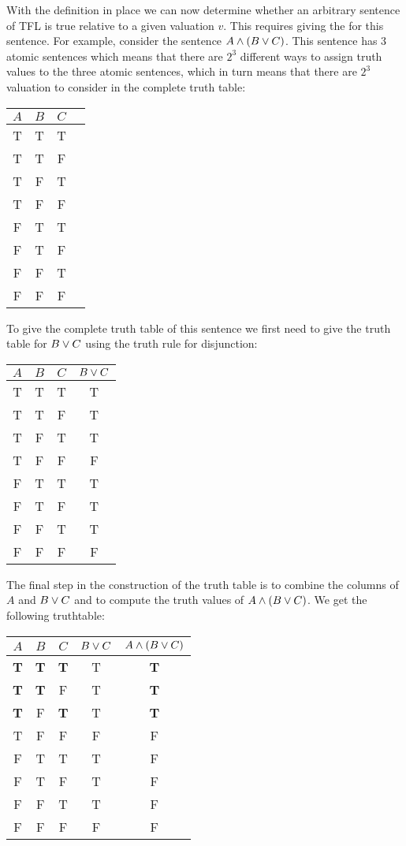 With the definition in place we can now determine whether an arbitrary sentence of TFL is true relative to a given valuation $v$. This requires giving the  for this sentence. For example, consider the sentence $A\mathbin{\wedge}(B\vee C)$. This sentence has 3 atomic sentences which means that there are $2^3$ different ways to assign truth values to the three atomic sentences, which in turn means that there are $2^3$ valuation to consider in the complete truth table: 

\begin{center}
\begin{tabular}{ccc|c}
$A$&$B$&$C$&\\\hline
T& T &T&\\
T & T & F&\\
T & F & T& \\
T & F &F&\\
F & T &T&\\
F& T & F & \\
F & F & T &\\
F & F & F& 
\end{tabular}
\end{center}


To give the complete truth table of this sentence we first need to give the truth table for $B\vee C$ using the truth rule for disjunction:

\begin{center}
\begin{tabular}{ccc|c}
$A$&$B$&$C$&$B\vee C$\\\hline
T& T &T&T\\
T & T & F&T\\
T & F & T&T \\
T & F &F&F\\
F & T &T&T\\
F& T & F & T\\
F & F & T &T\\
F & F & F& F
\end{tabular}
\end{center}

The final step in the construction of the truth table is to combine the columns of $A$ and $B\vee C$ and to compute the truth values of $A\wedge (B\vee C)$. We get the following truthtable:

\begin{center}
\begin{tabular}{ccc|c||c}
$A$&$B$&$C$&$B\vee C$&$A\mathbin{\wedge}(B\vee C)$\\\hline
\textbf{T} & \textbf{T} &\textbf{T}& T & \textbf{T}\\
\textbf{T} & \textbf{T} & F& T & \textbf{T}\\
\textbf{T} & F & \textbf{T}& T& \textbf{T}\\
T & F &F&F& F\\
F & T &T&T&F\\
F& T & F & T &F\\
F & F & T &T &F\\
F & F & F& F& F
\end{tabular}
\end{center}

